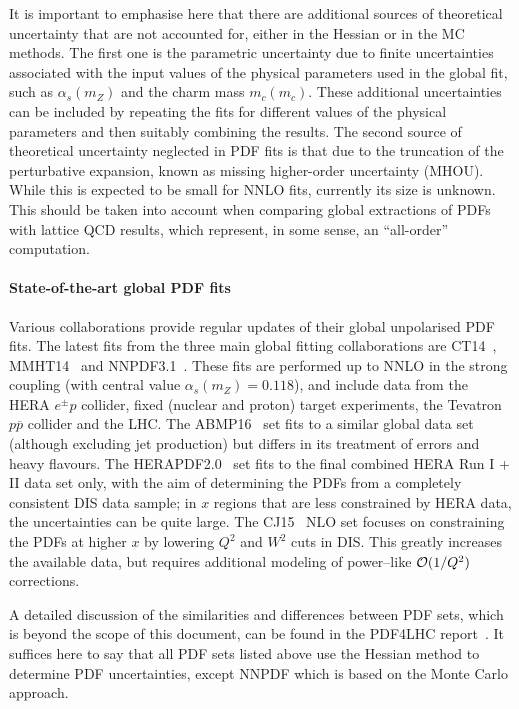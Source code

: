 It is important to emphasise here that there are additional sources of theoretical
uncertainty that are not accounted for, either in the Hessian or
in the MC methods.
%
The first one is the parametric uncertainty due to finite uncertainties associated
with the input values of the physical parameters used in the global fit, such
as $\alpha_s(m_Z)$ and the charm mass $m_c(m_c)$.
%
These additional uncertainties can be included by repeating the fits for different values of the
physical parameters and then suitably combining the results.
%
The second source of theoretical uncertainty neglected in PDF fits
is that due to the truncation of the perturbative expansion, known
as missing higher-order uncertainty (MHOU).
%
While this is expected to be small for NNLO fits, currently its size is unknown.
This should be taken into account when comparing global extractions of PDFs with lattice
QCD results, which represent, in some sense, an ``all-order'' computation.

\paragraph{State-of-the-art global PDF fits}
%
Various collaborations provide regular updates of their global unpolarised
PDF fits.
%
The latest fits from the three main global fitting collaborations
are CT14~\cite{Dulat:2015mca}, MMHT14~\cite{Harland-Lang:2014zoa} and
NNPDF3.1~\cite{Ball:2017nwa}.
%
These fits are performed up to NNLO in the strong coupling (with central value
$\alpha_s(m_Z)=0.118$),
and include data from the HERA $e^{\pm} p$ collider, fixed (nuclear and proton) target experiments, the Tevatron $p\overline{p}$ collider and the LHC. 
%
The ABMP16~\cite{Alekhin:2017kpj} set fits to a similar global data set
(although excluding jet production)
but differs in its treatment of errors and heavy flavours.
%
The HERAPDF2.0~\cite{Abramowicz:2015mha} set fits to the final combined HERA Run I + II data set only, with the aim of determining the PDFs from a completely consistent DIS data sample; in $x$ regions that are less constrained by HERA data, the uncertainties can be quite large.
%
The CJ15~\cite{Accardi:2016qay} NLO set focuses on constraining the PDFs at higher $x$ by lowering $Q^2$ and $W^2$ cuts in DIS.
%
This greatly increases the available data, but requires additional modeling of power--like ${\cal O}(1/Q^2)$ corrections.

A detailed discussion of the similarities and differences between
PDF sets, which is beyond the scope of this document,
can be found in the PDF4LHC report~\cite{Butterworth:2015oua}.
%
It suffices here to say that all PDF sets listed above use the Hessian
method to determine PDF uncertainties,
except NNPDF which is based on the Monte Carlo approach.

